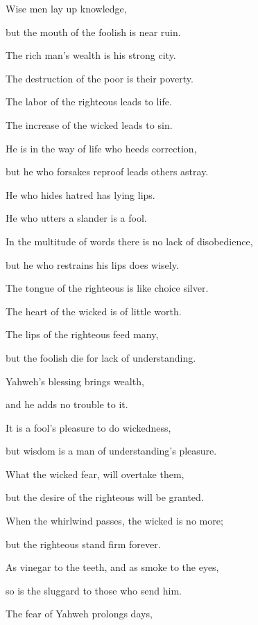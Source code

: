 {\par }{\Q {}Wise men lay up knowledge,
\par }{\QB but the mouth of the foolish is near ruin.
\par }{\Q {}The rich man’s wealth is his strong city.
\par }{\QB The destruction of the poor is their poverty.
\par }{\Q {}The labor of the righteous leads to life.
\par }{\QB The increase of the wicked leads to sin.
\par }{\Q {}He is in the way of life who heeds correction,
\par }{\QB but he who forsakes reproof leads others astray.
\par }{\Q {}He who hides hatred has lying lips.
\par }{\QB He who utters a slander is a fool.
\par }{\Q {}In the multitude of words there is no lack of disobedience,
\par }{\QB but he who restrains his lips does wisely.
\par }{\Q {}The tongue of the righteous is like choice silver.
\par }{\QB The heart of the wicked is of little worth.
\par }{\Q {}The lips of the righteous feed many,
\par }{\QB but the foolish die for lack of understanding.
\par }{\Q {}Yahweh’s blessing brings wealth,
\par }{\QB and he adds no trouble to it.
\par }{\Q {}It is a fool’s pleasure to do wickedness,
\par }{\QB but wisdom is a man of understanding’s pleasure.
\par }{\Q {}What the wicked fear, will overtake them,
\par }{\QB but the desire of the righteous will be granted.
\par }{\Q {}When the whirlwind passes, the wicked is no more;
\par }{\QB but the righteous stand firm forever.
\par }{\Q {}As vinegar to the teeth, and as smoke to the eyes,
\par }{\QB so is the sluggard to those who send him.
\par }{\Q {}The fear of Yahweh prolongs days,
}
